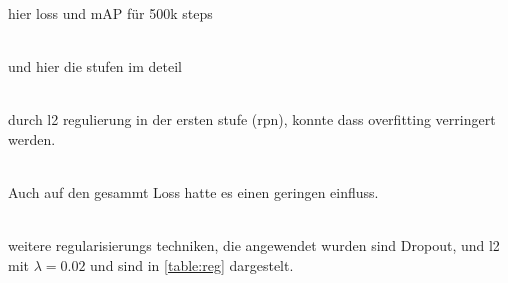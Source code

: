 hier loss und mAP für 500k steps
\\[1cm]
\begin{minipage}{0.5\textwidth}
  \centering
  \label{plot:map}
  \def\svgwidth{0.9\textwidth}
  
\end{minipage}
\begin{minipage}{0.5\textwidth}
  \centering
  \label{plot:loss}
  \def\svgwidth{0.9\textwidth}
  
\end{minipage}
\\[1cm]
und hier die stufen im deteil
\\[1cm]
\begin{minipage}{0.5\textwidth}
  \centering
  \label{plot:map}
  \def\svgwidth{0.9\textwidth}
  
\end{minipage}
\begin{minipage}{0.5\textwidth}
  \centering
  \label{plot:loss}
  \def\svgwidth{0.9\textwidth}
  
\end{minipage}
\\[1cm]
durch l2 regulierung in der ersten stufe (rpn), konnte 
dass overfitting verringert werden.
\\[1cm]
\begin{minipage}{0.5\textwidth}
  \centering
  \label{plot:map}
  \def\svgwidth{0.9\textwidth}
  
\end{minipage}
\begin{minipage}{0.5\textwidth}
  \centering
  \label{plot:loss}
  \def\svgwidth{0.9\textwidth}
  
\end{minipage}
\\[1cm]
Auch auf den gesammt Loss hatte es einen geringen
einfluss.
\\[1cm]
\begin{minipage}{0.5\textwidth}
  \centering
  \label{plot:map}
  \def\svgwidth{0.9\textwidth}
  
\end{minipage}
\begin{minipage}{0.5\textwidth}
  \centering
  \label{plot:loss}
  \def\svgwidth{0.9\textwidth}
  
\end{minipage}
\\[1cm]
weitere regularisierungs techniken, die angewendet wurden 
sind Dropout, und l2 mit $\lambda = 0.02$ und sind in 
\ref{table:reg} dargestelt.



